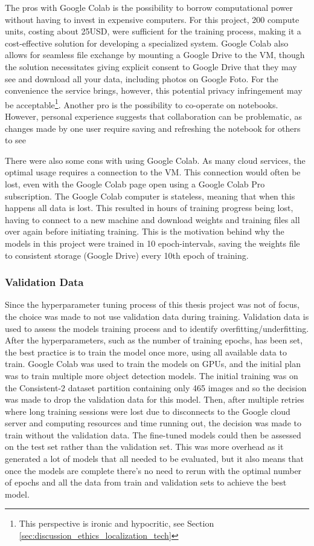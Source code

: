 The pros with Google Colab is the possibility to borrow computational power without having to invest in expensive computers. For this project, 200 compute units, costing about 25USD, were sufficient for the training process, making it a cost-effective solution for developing a specialized system. Google Colab also allows for seamless file exchange by mounting a Google Drive to the VM, though the solution necessitates giving explicit consent to Google Drive that they may see and download all your data, including photos on Google Foto. For the convenience the service brings, however, this potential privacy infringement may be acceptable\footnote{This perspective is ironic and hypocritic, see Section \ref{sec:discussion_ethics_localization_tech}}. Another pro is the possibility to co-operate on notebooks. However, personal experience suggests that collaboration can be problematic, as changes made by one user require saving and refreshing the notebook for others to see

There were also some cons with using Google Colab. As many cloud services, the optimal usage requires a connection to the VM. This connection would often be lost, even with the Google Colab page open using a Google Colab Pro subscription. The Google Colab computer is stateless, meaning that when this happens all data is lost. This resulted in hours of training progress being lost, having to connect to a new machine and download weights and training files all over again before initiating training. This is the motivation behind why the models in this project were trained in 10 epoch-intervals, saving the weights file to consistent storage (Google Drive) every 10th epoch of training.   

\subsubsection{Validation Data}
Since the hyperparameter tuning process of this thesis project was not of focus, the choice was made to not use validation data during training. Validation data is used to assess the models training process and to identify overfitting/underfitting. After the hyperparameters, such as the number of training epochs, has been set, the best practice is to train the model once more, using all available data to train. Google Colab was used to train the models on GPUs, and the initial plan was to train multiple more object detection models. The initial training was on the Consistent-2 dataset partition containing only 465 images and so the decision was made to drop the validation data for this model. Then, after multiple retries where long training sessions were lost due to disconnects to the Google cloud server and computing resources and time running out, the decision was made to train without the validation data. The fine-tuned models could then be assessed on the test set rather than the validation set. This was more overhead as it generated a lot of models that all needed to be evaluated, but it also means that once the models are complete there's no need to rerun with the optimal number of epochs and all the data from train and validation sets to achieve the best model.  


